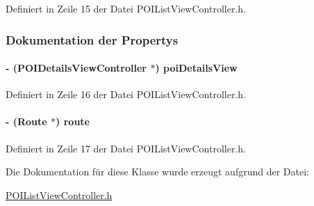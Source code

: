 Definiert in Zeile 15 der Datei POIListViewController.h.

\subsubsection{Dokumentation der Propertys}
\hypertarget{interface_p_o_i_list_view_controller_a59f9a24f115734414dccd160f9ed2856}{
\paragraph[{poiDetailsView}]{\setlength{\rightskip}{0pt plus 5cm}-\/ ({\bf POIDetailsViewController} $\ast$) poiDetailsView}\hfill}
\label{interface_p_o_i_list_view_controller_a59f9a24f115734414dccd160f9ed2856}


Definiert in Zeile 16 der Datei POIListViewController.h.\hypertarget{interface_p_o_i_list_view_controller_aa0bee7280ba1b0c3f904da878c120922}{
\paragraph[{route}]{\setlength{\rightskip}{0pt plus 5cm}-\/ ({\bf Route} $\ast$) route}\hfill}
\label{interface_p_o_i_list_view_controller_aa0bee7280ba1b0c3f904da878c120922}


Definiert in Zeile 17 der Datei POIListViewController.h.

Die Dokumentation für diese Klasse wurde erzeugt aufgrund der Datei:\begin{DoxyCompactItemize}
\item 
\hyperlink{_p_o_i_list_view_controller_8h}{POIListViewController.h}\end{DoxyCompactItemize}
